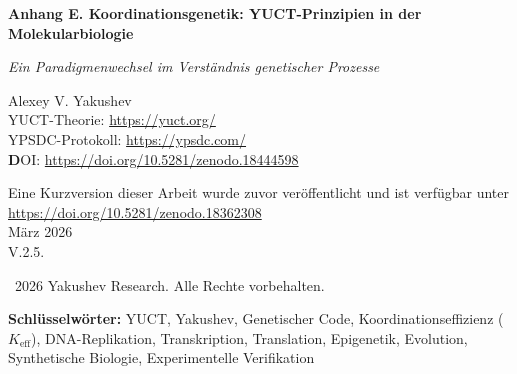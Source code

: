 \documentclass[12pt]{article}
\begin{document}
	
	\begin{titlepage}
		\begin{center}
			\vspace*{0cm}
			
			\Huge\textbf{Anhang E. Koordinationsgenetik: YUCT-Prinzipien in der Molekularbiologie}
			
			\vspace{1cm}
			
			\small\textit{Ein Paradigmenwechsel im Verständnis genetischer Prozesse}
			
			\vspace{1cm}
			\Large
			Alexey V. Yakushev\\
			
			YUCT-Theorie: \url{https://yuct.org/}\\
			YPSDC-Protokoll: \url{https://ypsdc.com/}\\
			
			\vspace{2cm}
			\textbf DOI: \url{https://doi.org/10.5281/zenodo.18444598}\\
			
			\vspace{1cm}
			
			\vspace{0cm}
			\large 
			Eine Kurzversion dieser Arbeit wurde zuvor veröffentlicht und ist verfügbar unter\\ \url{https://doi.org/10.5281/zenodo.18362308}\\
			\vspace{1cm}
			März 2026 \\ \large V.2.5.
			
			\vspace{4cm}
			\textcopyright~2026 Yakushev Research. Alle Rechte vorbehalten.
			
			\newpage	
			\begin{abstract}
				\noindent
				Diese Arbeit präsentiert eine grundlegende Neubetrachtung genetischer Prozesse durch die Linse der Koordinationsprinzipien von Yakushev. Wir zeigen, dass der genetische Code, die DNA-Replikation, die Genexpression und die Evolution Koordinationsprozesse mit messbarer Effizienz $K_{\text{eff}}$ darstellen. Es werden neue mathematische Modelle eingeführt, die bisher unerklärte Phänomene vorhersagen und Wege zu programmierbarer Evolution eröffnen. Die Theorie liefert überprüfbare Vorhersagen in mehreren experimentellen Bereichen, von einfachen Labortests bis hin zu komplexen gentechnischen Projekten.
			\end{abstract}
			
			\vspace{0cm}
			
			\noindent
			\textbf{Schlüsselwörter:} YUCT, Yakushev, Genetischer Code, Koordinationseffizienz ($K_{\text{eff}}$), DNA-Replikation, Transkription, Translation, Epigenetik, Evolution, Synthetische Biologie, Experimentelle Verifikation
			
			\vspace{0.5cm}
			
		\end{center}
	\end{titlepage}
	
\end{document}
